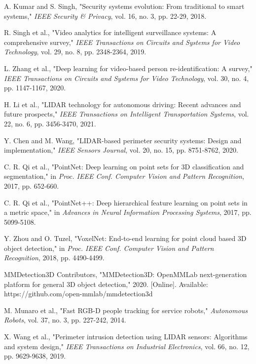 \documentclass[conference]{IEEEtran}
\begin{document}

\begin{thebibliography}{99}
 A. Kumar and S. Singh, "Security systems evolution: From traditional to smart systems," \textit{IEEE Security \& Privacy}, vol. 16, no. 3, pp. 22-29, 2018.

 R. Singh et al., "Video analytics for intelligent surveillance systems: A comprehensive survey," \textit{IEEE Transactions on Circuits and Systems for Video Technology}, vol. 29, no. 8, pp. 2348-2364, 2019.

 L. Zhang et al., "Deep learning for video-based person re-identification: A survey," \textit{IEEE Transactions on Circuits and Systems for Video Technology}, vol. 30, no. 4, pp. 1147-1167, 2020.

 H. Li et al., "LIDAR technology for autonomous driving: Recent advances and future prospects," \textit{IEEE Transactions on Intelligent Transportation Systems}, vol. 22, no. 6, pp. 3456-3470, 2021.

 Y. Chen and M. Wang, "LIDAR-based perimeter security systems: Design and implementation," \textit{IEEE Sensors Journal}, vol. 20, no. 15, pp. 8751-8762, 2020.

 C. R. Qi et al., "PointNet: Deep learning on point sets for 3D classification and segmentation," in \textit{Proc. IEEE Conf. Computer Vision and Pattern Recognition}, 2017, pp. 652-660.

 C. R. Qi et al., "PointNet++: Deep hierarchical feature learning on point sets in a metric space," in \textit{Advances in Neural Information Processing Systems}, 2017, pp. 5099-5108.

 Y. Zhou and O. Tuzel, "VoxelNet: End-to-end learning for point cloud based 3D object detection," in \textit{Proc. IEEE Conf. Computer Vision and Pattern Recognition}, 2018, pp. 4490-4499.

 MMDetection3D Contributors, "MMDetection3D: OpenMMLab next-generation platform for general 3D object detection," 2020. [Online]. Available: https://github.com/open-mmlab/mmdetection3d

 M. Munaro et al., "Fast RGB-D people tracking for service robots," \textit{Autonomous Robots}, vol. 37, no. 3, pp. 227-242, 2014.

 X. Wang et al., "Perimeter intrusion detection using LIDAR sensors: Algorithms and system design," \textit{IEEE Transactions on Industrial Electronics}, vol. 66, no. 12, pp. 9629-9638, 2019.


\end{thebibliography}
\end{document}
